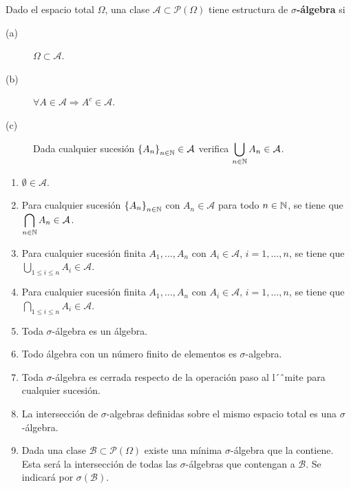 \begin{definition}
Dado el espacio total $\displaystyle \Omega  $, una clase $\displaystyle \mathcal{A} \subset \mathcal{P}\left(\Omega \right) $ tiene estructura de $\displaystyle \sigma  $\textbf{-álgebra} si 
\begin{description}
\item[(a)] $\displaystyle \Omega \subset \mathcal{A} $.
\item[(b)] $\displaystyle \forall A \in \mathcal{A} \Rightarrow A^{c} \in \mathcal{A} $.
\item[(c)] Dada cualquier sucesión $\displaystyle \left\{ A_{n}\right\} _{n\in\mathbb{N}} \in \mathcal{A} $ verifica $\displaystyle \bigcup_{n \in \mathbb{N}}A_{n}\in \mathcal{A} $.
\end{description}
\end{definition}
\begin{prop}
\begin{enumerate}
\item $\displaystyle \emptyset \in \mathcal{A} $.
\item Para cualquier sucesión $\displaystyle \left\{ A_{n}\right\} _{n\in\mathbb{N}} $ con $\displaystyle A_{n} \in \mathcal{A} $ para todo $\displaystyle n \in \mathbb{N} $, se tiene que $\displaystyle \bigcap_{n \in \mathbb{N}}A_{n} \in \mathcal{A} $.
\item Para cualquier sucesión finita $\displaystyle A_{1}, \ldots, A_{n} $ con $\displaystyle A_{i} \in \mathcal{A} $, $\displaystyle i = 1, \ldots, n $, se tiene que $\displaystyle \bigcup_{1\leq i \leq n}A_{i} \in \mathcal{A} $.
\item Para cualquier sucesión finita $\displaystyle A_{1}, \ldots, A_{n} $ con $\displaystyle A_{i} \in \mathcal{A} $, $\displaystyle i = 1, \ldots, n $, se tiene que $\displaystyle \bigcap_{1\leq i \leq n}A_{i} \in \mathcal{A} $.
\item Toda $\displaystyle \sigma  $-álgebra es un álgebra.
\item Todo álgebra con un número finito de elementos es $\displaystyle \sigma  $-algebra.
\item Toda $\displaystyle \sigma  $-álgebra es cerrada respecto de la operación paso al l´ˆmite para cualquier sucesión.
\item La intersección de $\displaystyle \sigma  $-algebras definidas sobre el mismo espacio total es una $\displaystyle \sigma  $-álgebra.
\item Dada una clase $\displaystyle \mathcal{B} \subset \mathcal{P}\left(\Omega\right)$ existe una mínima $\displaystyle \sigma  $-álgebra que la contiene. Esta será la intersección de todas las $\displaystyle \sigma  $-álgebras que contengan a $\displaystyle \mathcal{B} $. Se indicará por $\displaystyle \sigma\left(\mathcal{B}\right) $.
\end{enumerate}
\end{prop}

